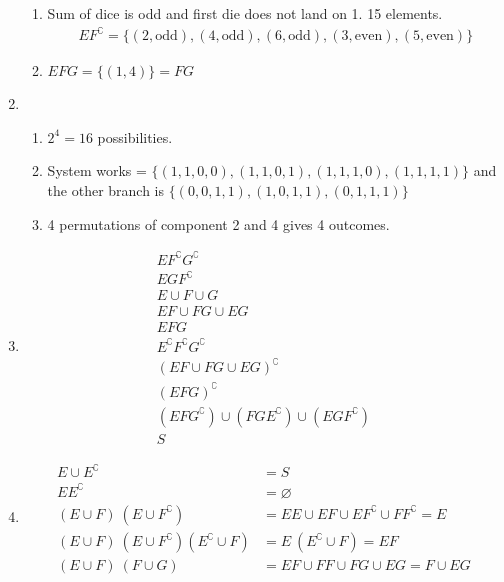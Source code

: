 \begin{enumerate}
\begin{enumerate}
		\item Sum of dice is odd and first die does not land on 1. 15 elements.
		\begin{align}
			E F^\complement = \{ (2, \text{odd}), (4, \text{odd}) , (6, \text{odd}), (3, \text{even}), (5, \text{even})\} 
		\end{align}
		
		\item $ EFG = \{ (1, 4) \} = FG $
	\end{enumerate} 
	
	\item \begin{enumerate}
		\item $ 2^4 = 16 $ possibilities.
		
		\item System works = $ \{ (1,1,0,0), (1,1,0,1), (1,1,1,0), (1,1,1,1)\} $ and the other branch is
		$ \{ (0,0,1,1), (1,0,1,1), (0,1,1,1) \} $ \\
		
		\item 4 permutations of component 2 and 4 gives 4 outcomes.
	\end{enumerate}
	
	\item 
		\begin{align}
			E F^\complement G^\complement \\
			E G F^\complement \\
			E \cup F \cup G \\
			EF \cup FG \cup EG \\
			EFG \\
			E ^\complement F^\complement G^\complement \\
			(EF \cup FG \cup EG )^\complement \\
			( EFG )^\complement \\
			( EF G^\complement) \cup (FG E^\complement) \cup (EG F^\complement) \\
			S
		\end{align}
	
	
	\item 
		\begin{align}
			E \cup E^\complement &= S \\
			E E^\complement &= \varnothing \\
			(E \cup F)\ (E \cup F^\complement) &= EE \cup EF \cup EF^\complement \cup FF^\complement = E \\
			(E \cup F)\ (E \cup F^\complement) (E^\complement \cup F) &= E\ (E^\complement \cup F) = EF \\
			(E \cup F)\ (F \cup G) &= EF \cup FF \cup FG \cup EG = F \cup EG
		\end{align}
	

\end{enumerate}
